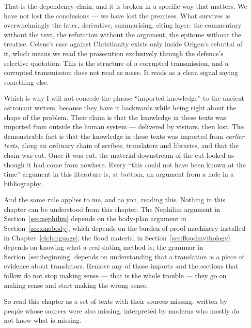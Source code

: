 That is the dependency chain, and it is broken in a specific way that matters. We have not
lost the conclusions --- we have lost the premises. What survives is overwhelmingly the
later, derivative, summarising, citing layer: the commentary without the text, the refutation
without the argument, the epitome without the treatise. Celsus's case against Christianity
exists only inside Origen's rebuttal of it, which means we read the prosecution exclusively
through the defence's selective quotation. This is the structure of a corrupted transmission,
and a corrupted transmission does not read as noise. It reads as a clean signal saying
something else.

Which is why I will not concede the phrase ``imported knowledge'' to the ancient astronaut
writers, because they have it backwards while being right about the shape of the problem.
Their claim is that the knowledge in these texts was imported from outside the human
system --- delivered by visitors, then lost. The demonstrable fact is that the knowledge in
these texts was imported from \emph{earlier texts}, along an ordinary chain of scribes,
translators and libraries, and that the chain was cut. Once it was cut, the material downstream
of the cut looked as though it had come from nowhere.  Every ``this could not have been known at the
time'' argument in this literature is, at bottom, an argument from a hole in a bibliography.

And the same rule applies to me, and to you, reading this. 
Nothing in this chapter can be understood from this chapter. The Nephilim argument in
Section~\ref{sec:nephilim} depends on the body-plan argument in Section~\ref{sec:onebody},
which depends on the burden-of-proof machinery installed in
Chapter~\ref{ch:language}; the flood material in Section~\ref{sec:floodmythology} depends on
knowing what a real dating method is; the grammar in Section~\ref{sec:beginning} depends on
understanding that a translation is a piece of evidence about translators. Remove any of those
imports and the sections that follow do not stop making sense --- that is the whole trouble ---
they go on making sense and start making the wrong sense.

So read this chapter as a set of texts with their sources missing, written by people whose
sources were also missing, interpreted by moderns who mostly do not know what is missing.



